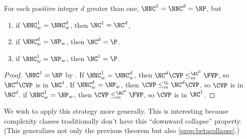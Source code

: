 \documentclass{article}
\DeclareMathOperator{\cl}{cl}
\begin{document}

\begin{theorem}
  For each positive integer $d$ greater than one, $\NNC^1 = \NNC^d = \NP$, but
  \begin{enumerate}
  \item if $\NNC^1_w = \NNC^d_w$, then $\NC^1 = \NC^d$,
  \item if $\NNC^d_w = \NP_w$, then $\NC^d = \P$.
  \item if $\NNC^1_w = \NP_w$, then $\NC^1 = \P$.
  \end{enumerate}
\end{theorem}
\begin{proof}
  $\NNC^1 = \NP$ by \autocite[Theorem~2.2]{wolf94}.
  If $\NNC^1_w = \NNC^d_w$, then $\NC^d \CVP \leq_m^{\AC^0} \FVP$, so $\NC^d \CVP$ is in $\NC^1$.
  If $\NNC^d_w = \NP_w$, then $\CVP \leq_m^{\L} \NC^d \CVP$, so $\CVP$ is in $\NC^d$.
  if $\NNC^1_w = \NP_w$, then $\CVP \leq_m^{\AC^0} \FVP$, so $\CVP$ is in $\NC^1$.
\end{proof}

We wish to apply this strategy more generally.
This is interesting because complexity classes traditionally don't have this ``downward collapse'' property.
(This generalizes not only the previous theorem but also \autoref{prop:betacollapse}.)
\end{document}
